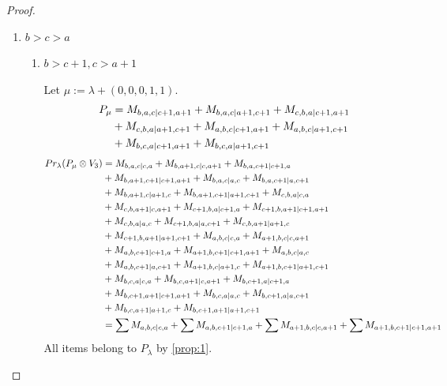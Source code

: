 \begin{proof}
\begin{enumerate}
  \item $b>c>a$ 
    \begin{enumerate}
      \item $b>c+1,c>a+1$\par
        Let $\mu:=\lambda + (0,0,0,1,1) $.
        \begin{equation}\notag
          \begin{aligned}
            P_\mu &= M_{b,a,c|c+1,a+1}
+ M_{b,a,c|a+1,c+1}
+ M_{c,b,a|c+1,a+1}\\ 
                                              &
+ M_{c,b,a|a+1,c+1}
+ M_{a,b,c|c+1,a+1}
+ M_{a,b,c|a+1,c+1}\\ 
                                              &
+ M_{b,c,a|c+1,a+1}
+ M_{b,c,a|a+1,c+1}
          \end{aligned}
        \end{equation}
        \begin{equation}\notag
          \begin{aligned}
            Pr_{\lambda}(P_\mu \otimes V_{3}) &=
M_{b,a,c|c,a}
+ M_{b,a+1,c|c,a+1}
+ M_{b,a,c+1|c+1,a}\\ 
                                              &
+ M_{b,a+1,c+1|c+1,a+1}
+ M_{b,a,c|a,c}
+ M_{b,a,c+1|a,c+1}\\ 
                                              &
+ M_{b,a+1,c|a+1,c}
+ M_{b,a+1,c+1|a+1,c+1}
+ M_{c,b,a|c,a}\\ 
                                              &
+ M_{c,b,a+1|c,a+1}
+ M_{c+1,b,a|c+1,a}
+ M_{c+1,b,a+1|c+1,a+1}\\ 
                                              &
+ M_{c,b,a|a,c}
+ M_{c+1,b,a|a,c+1}
+ M_{c,b,a+1|a+1,c}\\ 
                                              &
+ M_{c+1,b,a+1|a+1,c+1}
+ M_{a,b,c|c,a}
+ M_{a+1,b,c|c,a+1}\\ 
                                              &
+ M_{a,b,c+1|c+1,a}
+ M_{a+1,b,c+1|c+1,a+1}
+ M_{a,b,c|a,c}\\ 
                                              &
+ M_{a,b,c+1|a,c+1}
+ M_{a+1,b,c|a+1,c}
+ M_{a+1,b,c+1|a+1,c+1}\\ 
                                              &
+ M_{b,c,a|c,a}
+ M_{b,c,a+1|c,a+1}
+ M_{b,c+1,a|c+1,a}\\ 
                                              &
+ M_{b,c+1,a+1|c+1,a+1}
+ M_{b,c,a|a,c}
+ M_{b,c+1,a|a,c+1}\\ 
                                              &
+ M_{b,c,a+1|a+1,c}
+ M_{b,c+1,a+1|a+1,c+1} \\
                                               &=
\sum M_{a,b,c|c,a}
+ \sum M_{a,b,c+1|c+1,a}
+ \sum M_{a+1,b,c|c,a+1}
+ \sum M_{a+1,b,c+1|c+1,a+1}
          \end{aligned}
        \end{equation}
All items belong to $P_\lambda$ by \cref{prop:1}.


\end{enumerate}
\end{enumerate}
\end{proof}
